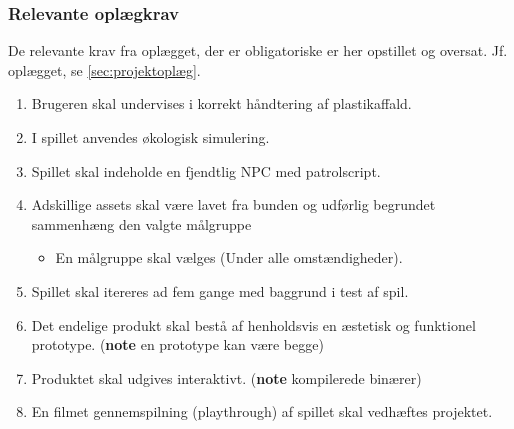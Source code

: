 \subsubsection{Relevante oplægkrav}\label{sec:kravoplæg}
De relevante krav fra oplægget, der er obligatoriske er her opstillet og oversat. Jf. oplægget, se \autoref{sec:projektoplæg}.
\begin{enumerate}
    \item Brugeren skal undervises i korrekt håndtering af plastikaffald.
    \item I spillet anvendes økologisk simulering.
    \item Spillet skal indeholde en fjendtlig NPC med patrolscript.
    \item Adskillige assets skal være lavet fra bunden og udførlig begrundet sammenhæng den valgte målgruppe
    \begin{itemize}
        \item En målgruppe skal vælges (Under alle omstændigheder). 
    \end{itemize}
    \item Spillet skal itereres ad fem gange med baggrund i test af spil.
    \item Det endelige produkt skal bestå af henholdsvis en æstetisk og funktionel prototype. (\textbf{note} en prototype kan være begge)
    \item Produktet skal udgives interaktivt. (\textbf{note} kompilerede binærer)
    \item En filmet gennemspilning (playthrough) af spillet skal vedhæftes projektet.
\end{enumerate}

